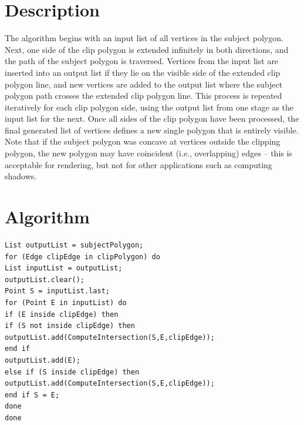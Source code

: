\documentclass[11pt]{report}
\begin{document}
\section{Description}
The algorithm begins with an input list of all vertices in the subject polygon. Next, one side of the clip polygon is extended infinitely in both directions, and the path of the subject polygon is traversed. Vertices from the input list are inserted into an output list if they lie on the visible side of the extended clip polygon line, and new vertices are added to the output list where the subject polygon path crosses the extended clip polygon line. This process is repeated iteratively for each clip polygon side, using the output list from one stage as the input list for the next. Once all sides of the clip polygon have been processed, the final generated list of vertices defines a new single polygon that is entirely visible. Note that if the subject polygon was concave at vertices outside the clipping polygon, the new polygon may have coincident (i.e., overlapping) edges – this is acceptable for rendering, but not for other applications such as computing shadows.


\section{Algorithm}

\begin{lstlisting}
List outputList = subjectPolygon;   
for (Edge clipEdge in clipPolygon) do
List inputList = outputList;
outputList.clear();
Point S = inputList.last;
for (Point E in inputList) do
if (E inside clipEdge) then
if (S not inside clipEdge) then
outputList.add(ComputeIntersection(S,E,clipEdge));
end if
outputList.add(E);
else if (S inside clipEdge) then
outputList.add(ComputeIntersection(S,E,clipEdge));
end if S = E;
done
done
\end{lstlisting}
\end{document}
